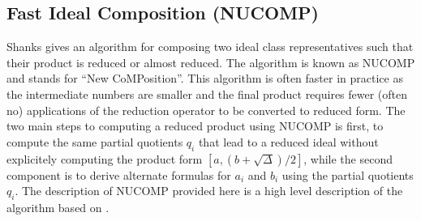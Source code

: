 \documentclass{ucalgthes1}
\theoremstyle{plain}
\theoremstyle{definition}
\begin{document}
\subsection{Fast Ideal Composition (NUCOMP)}\label{subsec:nucomp}

Shanks gives an algorithm for composing two ideal class representatives such that their product is reduced or almost reduced.  The algorithm is known as NUCOMP and stands for ``New CoMPosition''.  This algorithm is often faster in practice as the intermediate numbers are smaller and the final product requires fewer (often no) applications of the reduction operator to be converted to reduced form.  The two main steps to computing a reduced product using NUCOMP is first, to compute the same partial quotients $q_i$ that lead to a reduced ideal without explicitely computing the product form $[a,(b+\sqrt\Delta)/2]$, while the second component is to derive alternate formulas for $a_i$ and $b_i$ using the partial quotients $q_i$.  The description of NUCOMP provided here is a high level description of the algorithm based on \cite[pp.119-123]{Jac09}.
\end{document}
